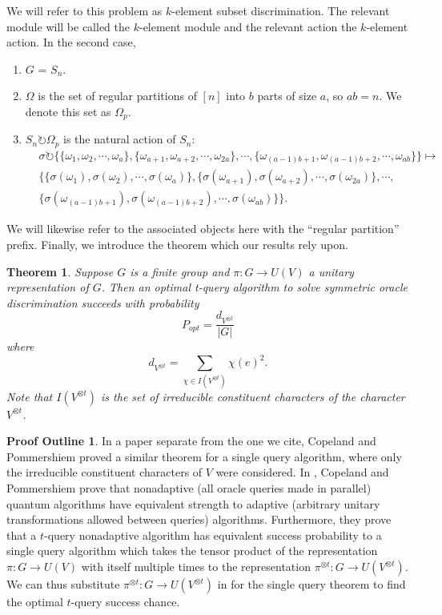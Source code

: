 \documentclass[12pt,twoside]{reedthesis}
\theoremstyle{plain}   %
\newtheorem{thm}{Theorem}[section] %
\theoremstyle{definition}
\newtheorem{outline}{Proof Outline}[section]
\theoremstyle{remark}
\numberwithin{equation}{section}
\def\acts{\circlearrowright} %
\begin{document}
  We will refer to this problem as $k$-element subset discrimination. The relevant module will be called the $k$-element module and the relevant action the $k$-element action.
  In the second case,
  \begin{enumerate}
  \item $G$ = $S_n$.
  \item $\Omega$ is the set of regular partitions of $[n]$ into $b$ parts of size $a$, so $ab = n$. We denote this set as $\Omega_p$.
  \item $S_n \acts \Omega_p$ is the natural action of $S_n$:
    \begin{align*}
      &\sigma \acts \{ \{ \omega_1, \omega_2, \cdots, \omega_a \}, \{ \omega_{a+1}, \omega_{a+2}, \cdots, \omega_{2a} \}, \cdots, \{ \omega_{(a-1)b + 1}, \omega_{(a-1)b + 2}, \cdots, \omega_{ab} \}  \} \mapsto &\\
      &\{ \{ \sigma(\omega_1), \sigma(\omega_2), \cdots, \sigma(\omega_a )\}, \{ \sigma(\omega_{a+1}), \sigma(\omega_{a+2}), \cdots, \sigma(\omega_{2a}) \}, \cdots, \\
      & \{ \sigma(\omega_{(a-1)b + 1}), \sigma(\omega_{(a-1)b + 2}), \cdots, \sigma(\omega_{ab}) \} \}.
    \end{align*}
  \end{enumerate}
  We will likewise refer to the associated objects here with the ``regular partition'' prefix.
  Finally, we introduce the theorem which our results rely upon.
  \begin{thm}
    Suppose $G$ is a finite group and $\pi : G \to U (V )$ a unitary representation of $G$. Then
    an optimal t-query algorithm to solve symmetric oracle discrimination succeeds with probability
    \[ P_{opt} = \dfrac{d_{V^{\otimes t}}}{|G|} \]
    where
    \[ d_{V^{\otimes t}} = \sum_{\chi \in I(V^{\otimes t})} \chi (e)^2.\]
    Note that $I(V^{\otimes t})$ is the set of irreducible constituent characters of the character $V^{\otimes t}$.
  \end{thm}
  \begin{outline}
    In a paper separate from the one we cite, Copeland and Pommershiem proved a similar theorem for a single query algorithm, where only the irreducible constituent characters of $V$ were considered.
    In \cite{copeland}, Copeland and Pommershiem prove that nonadaptive (all oracle queries made in parallel) quantum algorithms have equivalent strength to adaptive (arbitrary unitary transformations allowed between queries)
    algorithms.
    Furthermore, they prove that a $t$-query nonadaptive algorithm has equivalent success probability to a single query algorithm which takes the tensor product of the representation $\pi:G \to U(V)$ with itself multiple times to the
    representation $\pi^{\otimes t}:G \to U(V^{ \otimes t})$.
    We can thus substitute $\pi^{\otimes t}:G \to U(V^{ \otimes t})$ in for the single query theorem to find the optimal $t$-query success chance.
  \end{outline}
\end{document}
